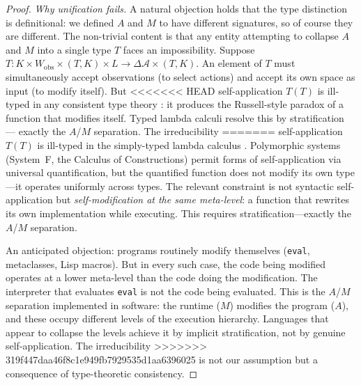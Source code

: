 \documentclass[11pt]{article}
\theoremstyle{definition}
\theoremstyle{remark}
\begin{document}
\begin{proof}
\emph{Why unification fails.} A natural objection holds that the type
distinction is definitional: we defined $A$ and $M$ to have different
signatures, so of course they are different. The non-trivial content
is that any entity attempting to collapse $A$ and $M$ into a single
type $T$ faces an impossibility. Suppose $T : K \times W_{\mathrm{obs}}
\times (T, K) \times L \to \Delta \mathcal{A} \times (T, K)$. An
element of $T$ must simultaneously accept observations (to select
actions) and accept its own space as input (to modify itself). But
<<<<<<< HEAD
self-application $T(T)$ is ill-typed in any consistent type theory
\cite{Barendregt1984}: it produces the Russell-style paradox of a
function that modifies itself. Typed lambda calculi resolve this by
stratification --- exactly the $A$/$M$ separation. The irreducibility
=======
self-application $T(T)$ is ill-typed in the simply-typed lambda
calculus \cite{Barendregt1984}. Polymorphic systems (System~F, the
Calculus of Constructions) permit forms of self-application via
universal quantification, but the quantified function does not modify
its own type---it operates uniformly across types. The relevant
constraint is not syntactic self-application but \emph{self-modification
at the same meta-level}: a function that rewrites its own
implementation while executing. This requires stratification---exactly
the $A$/$M$ separation.

An anticipated objection: programs routinely modify themselves
(\texttt{eval}, metaclasses, Lisp macros). But in every such case,
the code being modified operates at a lower meta-level than the code
doing the modification. The interpreter that evaluates \texttt{eval}
is not the code being evaluated. This is the $A$/$M$ separation
implemented in software: the runtime ($M$) modifies the program ($A$),
and these occupy different levels of the execution hierarchy. Languages
that appear to collapse the levels achieve it by implicit
stratification, not by genuine self-application. The irreducibility
>>>>>>> 319f447daa46f8c1e949fb7929535d1aa6396025
is not our assumption but a consequence of type-theoretic consistency.
\end{proof}
\end{document}
